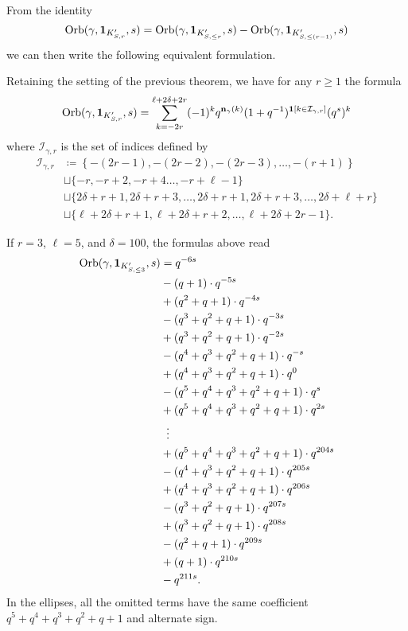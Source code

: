 From the identity
\[
  \operatorname{Orb}(\gamma, \mathbf{1}_{K'_{S, r}}, s)
  = \operatorname{Orb}(\gamma, \mathbf{1}_{K'_{S, \le r}}, s)
  - \operatorname{Orb}(\gamma, \mathbf{1}_{K'_{S, \le (r-1)}}, s)
\]
we can then write the following equivalent formulation.
\begin{corollary}
  Retaining the setting of the previous theorem, we have for any $r \ge 1$ the formula
  \[
    \operatorname{Orb}(\gamma, \mathbf{1}_{K'_{S, r}}, s)
    = \sum_{k = -2r}^{\ell + 2\delta + 2r}
    (-1)^k q^{\mathbf n_{\gamma}(k)}
    (1+q^{-1})^{\mathbf{1}[k \in \mathcal I_{\gamma, r}]}
    (q^s)^k
  \]
  where $\mathcal I_{\gamma, r}$ is the set of indices defined by
  \begin{align*}
    \mathcal{I}_{\gamma, r}
    &\coloneqq \left\{ -(2r-1), -(2r-2), -(2r-3), \dots, -(r+1) \right\} \\
    &\sqcup \{-r, -r+2, -r+4 \dots, -r+\ell-1 \} \\
    &\sqcup \{ 2\delta+r+1, 2\delta+r+3, \dots, 2\delta+r+1, 2\delta+r+3, \dots, 2\delta+\ell+r \} \\
    &\sqcup \{ \ell+2\delta+r+1, \ell+2\delta+r+2, \dots, \ell+2\delta+2r-1 \}.
  \end{align*}
\end{corollary}

\begin{example}
  If $r=3$, $\ell=5$, and $\delta=100$, the formulas above read
  \begin{align*}
  \Orb(\gamma, \mathbf{1}_{K'_{S, \le 3}}, s)
  &= q^{-6s} \\
  &- (q+1) \cdot q^{-5s} \\
  &+ (q^2+q+1) \cdot q^{-4s} \\
  &- (q^3+q^2+q+1) \cdot q^{-3s} \\
  &+ (q^3+q^2+q+1) \cdot q^{-2s} \\
  &- (q^4+q^3+q^2+q+1) \cdot q^{-s} \\
  &+ (q^4+q^3+q^2+q+1) \cdot q^{0} \\
  &- (q^5+q^4+q^3+q^2+q+1) \cdot q^{s} \\
  &+ (q^5+q^4+q^3+q^2+q+1) \cdot q^{2s} \\
  &\vdotswithin= \\
  &+ (q^5+q^4+q^3+q^2+q+1) \cdot q^{204s} \\
  &- (q^4+q^3+q^2+q+1) \cdot q^{205s} \\
  &+ (q^4+q^3+q^2+q+1) \cdot q^{206s} \\
  &- (q^3+q^2+q+1) \cdot q^{207s} \\
  &+ (q^3+q^2+q+1) \cdot q^{208s} \\
  &- (q^2+q+1) \cdot q^{209s} \\
  &+ (q+1) \cdot q^{210s} \\
  &- q^{211s}.
  \end{align*}
  In the ellipses, all the omitted terms
  have the same coefficient $q^5+q^4+q^3+q^2+q+1$
  and alternate sign.
\end{example}

